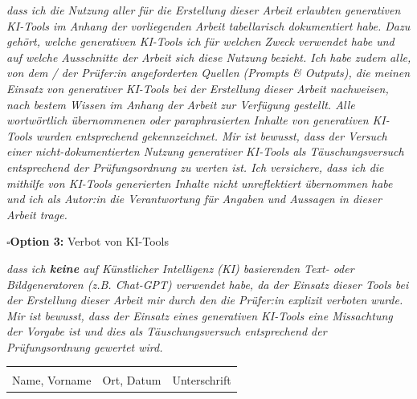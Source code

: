 \textit{%
	dass ich die Nutzung aller für die Erstellung dieser Arbeit erlaubten generativen KI-Tools im Anhang der vorliegenden Arbeit tabellarisch dokumentiert habe.
	Dazu gehört, welche generativen KI-Tools ich für welchen Zweck verwendet habe und auf welche Ausschnitte der Arbeit sich diese Nutzung bezieht.
	Ich habe zudem alle, von dem / der Prüfer:in angeforderten Quellen (Prompts \& Outputs), die meinen Einsatz von generativer KI-Tools bei der Erstellung dieser Arbeit nachweisen, nach bestem Wissen im Anhang der Arbeit zur Verfügung gestellt.
	Alle wortwörtlich übernommenen oder paraphrasierten Inhalte von generativen KI-Tools wurden entsprechend gekennzeichnet.
	Mir ist bewusst, dass der Versuch einer nicht-dokumentierten Nutzung generativer KI-Tools als Täuschungsversuch entsprechend der Prüfungsordnung zu werten ist.
	Ich versichere, dass ich die mithilfe von KI-Tools generierten Inhalte nicht unreflektiert übernommen habe und ich als Autor:in die Verantwortung für Angaben und Aussagen in dieser Arbeit trage.
}

\vspace{0.5\baselineskip}

$\square$\hspace{3em}\textbf{Option 3:} Verbot von KI-Tools

\textit{%
	dass ich \textbf{keine} auf Künstlicher Intelligenz (KI) basierenden Text- oder Bildgeneratoren (z.B. Chat-GPT) verwendet habe, da der Einsatz dieser Tools bei der Erstellung dieser Arbeit mir durch den \/ die Prüfer:in explizit verboten wurde.
	Mir ist bewusst, dass der Einsatz eines generativen KI-Tools eine Missachtung der Vorgabe ist und dies als Täuschungsversuch entsprechend der Prüfungsordnung gewertet wird.
}

\vspace{4\baselineskip}

\noindent
\begin{tabularx}{\textwidth}{X X X}
	\underline{\hspace{0.95\linewidth}} &
	\underline{\hspace{0.85\linewidth}} &
	\underline{\hspace{0.95\linewidth}}                             \\
	Name, Vorname                       & Ort, Datum & Unterschrift
\end{tabularx}

\normalsize

\clearpage
